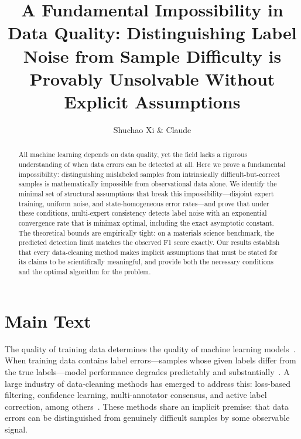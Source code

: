 %

\title{A Fundamental Impossibility in Data Quality: Distinguishing Label Noise from Sample Difficulty is Provably Unsolvable Without Explicit Assumptions}

\author{Shuchao Xi \& Claude}



\maketitle

\begin{abstract}
All machine learning depends on data quality, yet the field lacks a rigorous understanding of when data errors can be detected at all. Here we prove a fundamental impossibility: distinguishing mislabeled samples from intrinsically difficult-but-correct samples is mathematically impossible from observational data alone. We identify the minimal set of structural assumptions that break this impossibility---disjoint expert training, uniform noise, and state-homogeneous error rates---and prove that under these conditions, multi-expert consistency detects label noise with an exponential convergence rate that is minimax optimal, including the exact asymptotic constant. The theoretical bounds are empirically tight: on a materials science benchmark, the predicted detection limit matches the observed F1 score exactly. Our results establish that every data-cleaning method makes implicit assumptions that must be stated for its claims to be scientifically meaningful, and provide both the necessary conditions and the optimal algorithm for the problem.
\end{abstract}

\section{Main Text}

The quality of training data determines the quality of machine learning models~\cite{...}. When training data contains label errors---samples whose given labels differ from the true labels---model performance degrades predictably and substantially~\cite{...}. A large industry of data-cleaning methods has emerged to address this: loss-based filtering, confidence learning, multi-annotator consensus, and active label correction, among others~\cite{...}. These methods share an implicit premise: that data errors can be distinguished from genuinely difficult samples by some observable signal.

